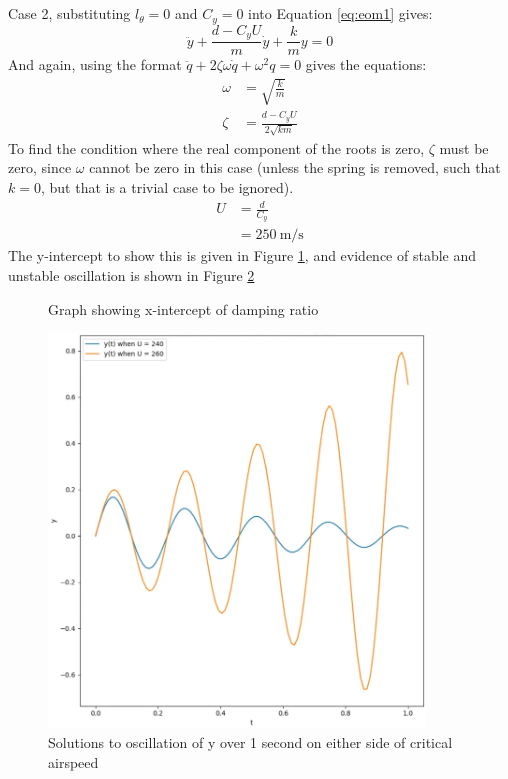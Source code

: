 \documentclass[11pt]{article}
\begin{document}
\\\\
Case 2, substituting $l_{\theta} = 0$ and $C_y = 0$ into Equation \ref{eq:eom1} gives:
\begin{equation}
  \ddot{y}+\frac{d-C_yU}{m}\dot{y}+\frac{k}{m}y = 0
\end{equation}
And again, using the format $\ddot{q} + 2\zeta\omega\dot{q}+\omega^2q = 0$ gives the equations:
\begin{align*}
  \omega &= \sqrt{\frac{k}{m}} \\
  \zeta &= \frac{d-C_yU}{2\sqrt{km}}
\end{align*}
To find the condition where the real component of the roots is zero, $\zeta$ must be zero, since $\omega$ cannot be zero in this case (unless the spring is removed, such that $k = 0$, but that is a trivial case to be ignored).
\begin{align*}
  U  &= \frac{d}{C_y} \\
  &= 250 ~\mathrm{m/s}
\end{align*}
The y-intercept to show this is given in Figure \ref{fig:decoupled_case2}, and evidence of stable and unstable oscillation is shown in Figure \ref{fig:decoupled_solution}
\begin{figure}[h!]
  \centering
  \caption{Graph showing x-intercept of damping ratio}\label{fig:decoupled_case2}
\end{figure}
\begin{figure}[h!]
  \centering
  \includegraphics[width=100mm]{decoupled_solution.png}
  \caption{Solutions to oscillation of y over 1 second on either side of critical airspeed}\label{fig:decoupled_solution}
\end{figure}
\end{document}
